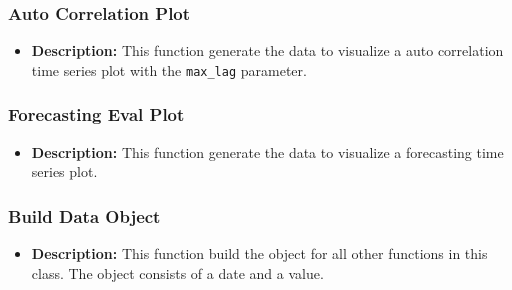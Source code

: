 \documentclass[11pt, a4paper]{article}
\begin{document}
\subsubsection*{Auto Correlation Plot}
\begin{itemize}
 \item[] \textbf{Description:} This function generate the data to visualize a auto correlation time series plot with the \texttt{max\_lag} parameter.
\end{itemize}

\subsubsection*{Forecasting Eval Plot}
\begin{itemize}
 \item[] \textbf{Description:} This function generate the data to visualize a forecasting time series plot.
\end{itemize}

\subsubsection*{Build Data Object}
\begin{itemize}
 \item[] \textbf{Description:} This function build the object for all other functions in this class. The object consists of a date and a value.
\end{itemize}
\end{document}
